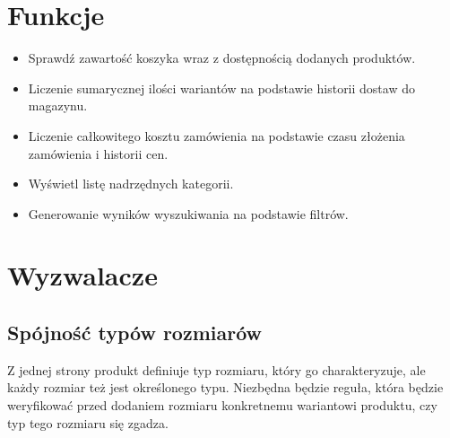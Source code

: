 \section*{Funkcje}
\begin{itemize}
    \item Sprawdź zawartość koszyka wraz z dostępnością dodanych produktów.
    \item Liczenie sumarycznej ilości wariantów na podstawie historii dostaw do magazynu.
    \item Liczenie całkowitego kosztu zamówienia na podstawie czasu złożenia zamówienia i historii cen.
    \item Wyświetl listę nadrzędnych kategorii.
    \item Generowanie wyników wyszukiwania na podstawie filtrów.
\end{itemize}

\section*{Wyzwalacze}
\subsection*{Spójność typów rozmiarów}
Z jednej strony produkt definiuje typ rozmiaru, który go charakteryzuje, ale każdy rozmiar też jest określonego typu. Niezbędna będzie reguła, która będzie weryfikować przed dodaniem rozmiaru konkretnemu wariantowi produktu, czy typ tego rozmiaru się zgadza.



